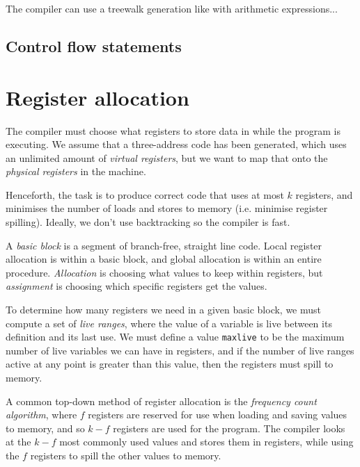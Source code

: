 The compiler can use a treewalk generation like with arithmetic
expressions...


\subsection{Control flow statements}




\section{Register allocation}

The compiler must choose what registers to store data in while the
program is executing. We assume that a three-address code has been
generated, which uses an unlimited amount of \textit{virtual
registers}, but we want to map that onto the \textit{physical
registers} in the machine.

Henceforth, the task is to produce correct code that uses at most $k$
registers, and minimises the number of loads and stores to memory
(i.e. minimise register spilling). Ideally, we don't use backtracking
so the compiler is fast.

A \textit{basic block} is a segment of branch-free,
straight line code. Local register allocation is within a basic block,
and global allocation is within an entire
procedure. \textit{Allocation} is choosing what values to keep within
registers, but \textit{assignment} is choosing which specific
registers get the values.

To determine how many registers we need in a given basic block, we
must compute a set of \textit{live ranges}, where the value of a
variable is live between its definition and its last use. We must
define a value \texttt{maxlive} to be the maximum number of live
variables we can have in registers, and if the number of live ranges
active at any point is greater than this value, then the registers
must spill to memory.

A common top-down method of register allocation is
the \textit{frequency count algorithm}, where $f$ registers are
reserved for use when loading and saving values to memory, and so
$k-f$ registers are used for the program. The compiler looks at the
$k-f$ most commonly used values and stores them in registers, while
using the $f$ registers to spill the other values to memory.

